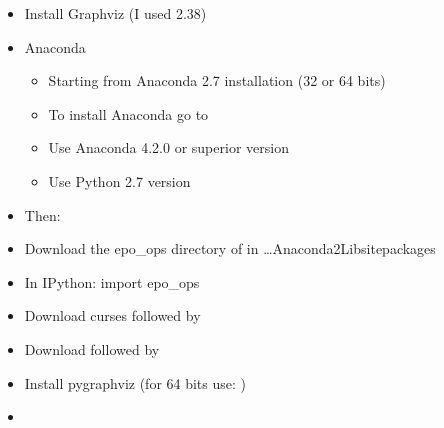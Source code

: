\documentclass[letterpaper,10pt,english]{sphinxmanual}
\begin{document}
\label{\detokenize{setup:install-patent2net-on-windows}}\begin{itemize}
\item {} 
Install Graphviz (I used 2.38)

\item {} 
Anaconda
\begin{itemize}
\item {} 
Starting from Anaconda 2.7 installation (32 or 64 bits)

\item {} 
To install Anaconda go to 

\item {} 
Use Anaconda 4.2.0 or superior version

\item {} 
Use Python 2.7 version

\end{itemize}

\item {} 
Then:

\begin{sphinxVerbatim}[commandchars=\\\{\}]
   
   
   
\end{sphinxVerbatim}

\item {} 
Download the epo\_ops directory of  in …Anaconda2Libsite\sphinxhyphen{}packages

\item {} 
In IPython: import epo\_ops

\item {} 
Download curses  followed by

\item {} 
Download  followed by

\item {} 
Install pygraphviz (for 64 bits use: )

\item {} 

\end{itemize}
\end{document}
